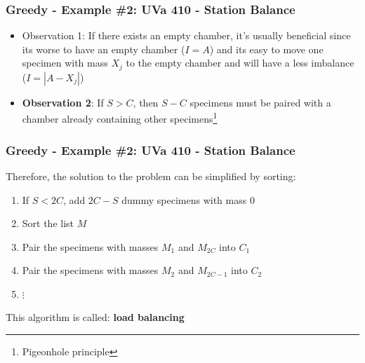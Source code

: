 \documentclass{beamer}
\begin{document}
\begin{frame}[fragile]
\frametitle{Greedy - Example \#2: UVa 410 - Station Balance}

\begin{itemize}
    \item Observation 1: If there exists an empty chamber, it's usually beneficial since its worse to have an empty chamber ($I = A$) and its easy to move one specimen with mass $X_j$ to the empty chamber and will have a less imbalance ($I = |A - X_j|$)
    \item \textbf{Observation 2}: If $S>C$, then $S-C$ specimens must be paired with a chamber already containing other specimens\footnote{Pigeonhole principle}
\end{itemize}
\end{frame}

\begin{frame}[fragile]
\frametitle{Greedy - Example \#2: UVa 410 - Station Balance}

Therefore, the solution to the problem can be simplified by sorting:
\begin{enumerate}
    \item If $S<2C$, add $2C - S$ dummy specimens with mass 0
    \item Sort the list $M$
    \item Pair the specimens with masses $M_1$ and $M_{2C}$ into $C_1$
    \item Pair the specimens with masses $M_2$ and $M_{2C-1}$ into $C_2$
    \item $\vdots$
\end{enumerate}

This algorithm is called: \textbf{load balancing}

\end{frame}
\end{document}
